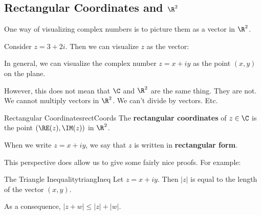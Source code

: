 \subsection{Rectangular Coordinates and $\R^2$}

One way of visualizing complex numbers is to picture them as a vector in $\R^2$.

\begin{ex}{}{} Consider $z = 3 + 2i$. Then we can visualize $z$ as the vector:

\begin{center}
\end{center}

\end{ex}

\begin{note} In general, we can visualize the complex number $z = x + iy$ as the point $(x,y)$ on the plane.

However, this does not mean that $\C$ and $\R^2$ are the same thing. They are not. We cannot multiply vectors in $\R^2$. We can't divide by vectors. Etc.
\end{note}

\begin{defbo}{Rectangular Coordinates}{rectCoords}  The {\bf rectangular coordinates} of $z \in \C$ is the point $(\RE(z), \IM(z))$ in $\R^2$.

When we write $z = x + iy$, we say that $z$ is written in {\bf rectangular form}.
\end{defbo}


This perspective does allow us to give some fairly nice proofs. For example:

\begin{thmbo}{The Triangle Inequality}{triangIneq}
 Let $z = x+iy$. Then $|z|$ is equal to the length of the vector $(x,y)$.

\vspace{5pt}

As a consequence, $|z + w| \le |z| + |w|$.
\end{thmbo}

